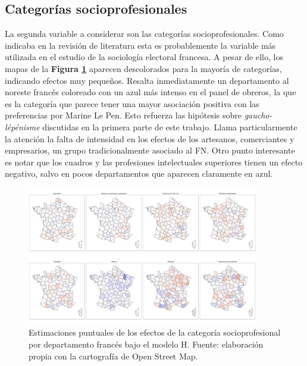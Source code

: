 \subsection{Categorías socioprofesionales}

La segunda variable a considerar son las categorías socioprofesionales. Como indicaba en la revisión de literatura esta es probablemente la variable más utilizada en el estudio de la sociología electoral francesa. A pesar de ello, los mapas de la \textbf{Figura \ref{fig:Mapa_Efectos_Cat_Socioprof}} aparecen descolorados para la mayoría de categorías, indicando efectos muy pequeños. Resalta inmediatamente un departamento al noreste francés coloreado con un azul más intenso en el panel de obreros, la que es la categoría que parece tener una mayor asociación positiva con las preferencias por Marine Le Pen. Esto refuerza las hipótesis sobre \textit{gaucho-lépénisme} discutidas en la primera parte de este trabajo. Llama particularmente la atención la falta de intensidad en los efectos de los artesanos, comerciantes y empresarios, un grupo tradicionalmente asociado al FN. Otro punto interesante es notar que los cuadros y las profesiones intelectuales superiores tienen un efecto negativo, salvo en pocos departamentos que aparecen claramente en azul.\\ 

\begin{figure}[h]
	\centering
	\includegraphics[width = 0.9\textwidth]{Figs/Efectos/Mapa_Efectos_Cat_Socioprof_Modelo_H}
	\caption{Estimaciones puntuales de los efectos de la categoría socioprofesional por departamento francés bajo el modelo H. Fuente: elaboración propia con la cartografía de Open Street Map.}
	\label{fig:Mapa_Efectos_Cat_Socioprof}
\end{figure}

